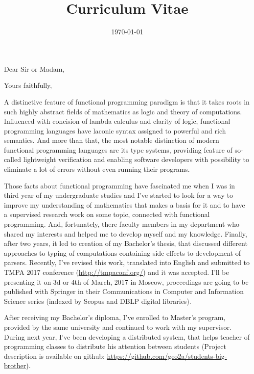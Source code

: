 \documentclass[11pt,a4paper,sans]{moderncv} %
\title{Curriculum Vitae}
\begin{document}


\clearpage

\date{\today} %
\opening{Dear Sir or Madam,} %
\closing{Yours faithfully,} %

\makelettertitle %

A distinctive feature of functional programming paradigm is that it takes
roots in such highly abstract fields of mathematics as logic and theory of
computations. Influenced with concision of lambda calculus and clarity of logic, 
functional programming languages have laconic syntax assigned to powerful
and rich semantics. And more than that, the most notable distinction of modern 
functional programming languages are its type systems, providing feature of
so-called lightweight verification and enabling software developers with
possibility to eliminate a lot of errors without even running their programs.

Those facts about functional programming have fascinated me when I was in third
year of my undergraduate studies and I've started to look for a way to improve 
my understanding of mathematics that makes a basis for it and to have a
supervised research work on some topic, connected with functional programming. 
And, fortunately, there faculty members in my department who shared my interests
and helped me to develop myself and my knowledge. Finally, after two years, 
it led to creation of my Bachelor's thesis, that discussed different approaches
to typing of computations containing side-effects to development of parsers.
Recently, I've revised this work, translated into English and submitted to 
TMPA 2017 conference (\url{http://tmpaconf.org/}) and it was accepted. I'll be
presenting it on 3d or 4th of March, 2017 in Moscow, proceedings are going to
be published with Springer in their Communications in Computer and Information 
Science series (indexed by Scopus and DBLP digital libraries). 

After receiving my Bachelor's diploma, I've enrolled to Master's
program, provided by the same university and continued to work with my
supervisor. During next year, I've been developing a distributed system, 
that helps teacher of programming classes to distribute his attention between
students (Project description is available on github: \url{https://github.com/geo2a/students-big-brother}). 
\end{document}
